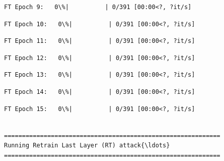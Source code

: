 \documentclass[11pt]{article}
\begin{document}
    
    
    \begin{Verbatim}[commandchars=\\\{\}]
FT Epoch 9:   0\%|          | 0/391 [00:00<?, ?it/s]
    \end{Verbatim}

    
    
    \begin{Verbatim}[commandchars=\\\{\}]
FT Epoch 10:   0\%|          | 0/391 [00:00<?, ?it/s]
    \end{Verbatim}

    
    
    \begin{Verbatim}[commandchars=\\\{\}]
FT Epoch 11:   0\%|          | 0/391 [00:00<?, ?it/s]
    \end{Verbatim}

    
    
    \begin{Verbatim}[commandchars=\\\{\}]
FT Epoch 12:   0\%|          | 0/391 [00:00<?, ?it/s]
    \end{Verbatim}

    
    
    \begin{Verbatim}[commandchars=\\\{\}]
FT Epoch 13:   0\%|          | 0/391 [00:00<?, ?it/s]
    \end{Verbatim}

    
    
    \begin{Verbatim}[commandchars=\\\{\}]
FT Epoch 14:   0\%|          | 0/391 [00:00<?, ?it/s]
    \end{Verbatim}

    
    
    \begin{Verbatim}[commandchars=\\\{\}]
FT Epoch 15:   0\%|          | 0/391 [00:00<?, ?it/s]
    \end{Verbatim}

    
    \begin{Verbatim}[commandchars=\\\{\}]

============================================================
Running Retrain Last Layer (RT) attack{\ldots}
============================================================
    \end{Verbatim}
\end{document}
